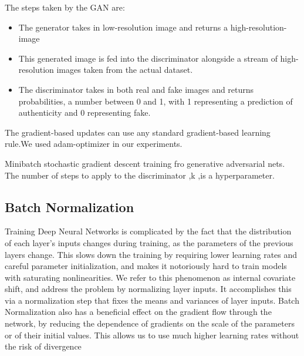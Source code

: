 The steps taken by the GAN are: 
\begin{itemize}
 \item The generator takes in low-resolution image  and returns a high-resolution-image
 \item This generated image is fed into the discriminator alongside a stream of high-resolution images taken from the actual dataset.
 \item The discriminator takes in both real and fake images and returns probabilities, a number between 0 and 1, with 1 representing a prediction of authenticity and 0 representing fake.
\end{itemize}
\begin{algorithm}[H]
\DontPrintSemicolon
{}
The gradient-based updates can use any standard gradient-based learning rule.We used adam-optimizer in our experiments.\;
\caption{Minibatch stochastic gradient descent training fro generative adversarial nets. The number of steps to apply to the discriminator ,k ,is a hyperparameter.}
\end{algorithm}
\subsection{Batch Normalization}
Training Deep Neural Networks is complicated by the fact that the distribution of each layer’s inputs changes during training, as the parameters of the previous layers change. This slows down the training by requiring lower learning rates and careful parameter initialization, and makes it notoriously hard to train models with saturating nonlinearities.  We refer to this phenomenon as internal covariate shift,  and  address the  problem by  normalizing layer inputs. It accomplishes  this  via  a  normalization  step  that  fixes  the
means and variances of layer inputs. Batch Normalization
also has a beneficial effect on the gradient flow through
the  network,  by  reducing  the  dependence  of  gradients
on the scale  of the parameters or of their initial values.
This  allows  us  to  use  much  higher  learning  rates  without the  risk  of  divergence


